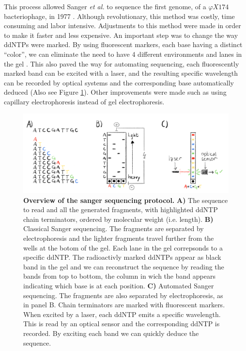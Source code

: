 \documentclass[
  11pt,
  twoside,
  BCOR=10mm,
  listof=totoc]{scrbook}
\newcommand{\extcaption}[2]{
    \caption[#1]{
        \textbf{#1}\newline
        #2
    }
}
\begin{document}
This process allowed Sanger \emph{et al.} to sequence the first genome, of a \(\varphi X174\) bacteriophage, in 1977 \autocite{sangerNucleotideSequenceBacteriophage1977}. Although revolutionary, this method was costly, time consuming and labor intensive. Adjustments to this method were made in order to make it faster and less expensive. An important step was to change the way ddNTPs were marked. By using fluorescent markers, each base having a distinct ``color'', we can eliminate the need to have 4 different environments and lanes in the gel \autocite{smithSynthesisOligonucleotidesContaining1985,smithFluorescenceDetectionAutomated1986}. This also paved the way for automating sequencing, each fluorescently marked band can be excited with a laser, and the resulting specific wavelength can be recorded by optical systems and the corresponding base automatically deduced \autocite{ansorgeAutomatedDNASequencing1987} (Also see Figure \ref{fig:sanger}). Other improvements were made such as using capillary electrophoresis instead of gel electrophoresis.

\begin{figure}[h]
\centering
\includegraphics[width=0.8\linewidth]{./figures/Sequence-Intro/Sanger.png}
\extcaption{Overview of the sanger sequencing protocol.}{\textbf{A)} The sequence to read and all the generated fragments, with highlighted ddNTP chain terminators, ordered by molecular weight (i.e. length). \textbf{B)} Classical Sanger sequencing. The fragments are separated by electrophoresis and the lighter fragments travel further from the wells at the botom of the gel. Each lane in the gel correpsonds to a specific ddNTP. The radioactivly marked ddNTPs appear as black band in the gel and we can reconstruct the sequence by reading the bands from top to bottom, the column in wich the band appears indicating which base is at each position. \textbf{C)} Automated Sanger sequencing. The fragments are also separated by electrophoresis, as in panel B. Chain terminators are marked with fluorescent markers. When excited by a laser, each ddNTP emits a specific wavelength. This is read by an optical sensor and the corresponding ddNTP is recorded. By exciting each band we can quickly deduce the sequence. }
\label{fig:sanger}
\end{figure}
\end{document}

